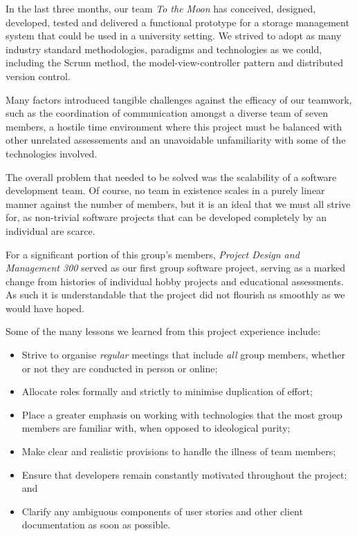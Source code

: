 \documentclass[a4paper,titlepage,12pt]{article}
\begin{document}
In the last three months, our team \textit{To the Moon} has conceived,
designed, developed, tested and delivered a functional prototype for a storage
management system that could be used in a university setting. We strived to
adopt as many industry standard methodologies, paradigms and technologies as
we could, including the Scrum method, the model-view-controller pattern and
distributed version control.

Many factors introduced tangible challenges against the efficacy of our
teamwork, such as the coordination of communication amongst a diverse team of
seven members, a hostile time environment where this project must be balanced
with other unrelated assessements and an unavoidable unfamiliarity with some of
the technologies involved.

The overall problem that needed to be solved was the scalability of a software
development team. Of course, no team in existence scales in a purely linear
manner against the number of members, but it is an ideal that we must all
strive for, as non-trivial software projects that can be developed completely
by an individual are scarce.

For a significant portion of this group's members, \textit{Project Design and
Management 300} served as our first group software project, serving as a marked
change from histories of individual hobby projects and educational assessments.
As such it is understandable that the project did not flourish as smoothly as
we would have hoped.

Some of the many lessons we learned from this project experience include:

\begin{itemize}
	\item Strive to organise \textit{regular} meetings that include
	      \textit{all} group members, whether or not they are
	      conducted in person or online;
	\item Allocate roles formally and strictly to minimise duplication of
	      effort;
	\item Place a greater emphasis on working with technologies that the
	      most group members are familiar with, when opposed to ideological
	      purity;
	\item Make clear and realistic provisions to handle the illness of team
	      members;
	\item Ensure that developers remain constantly motivated throughout the
	      project; and
	\item Clarify any ambiguous components of user stories and other client
	      documentation as soon as possible.
\end{itemize}

\begin{sloppypar}
	\printbibliography
\end{sloppypar}
\end{document}
